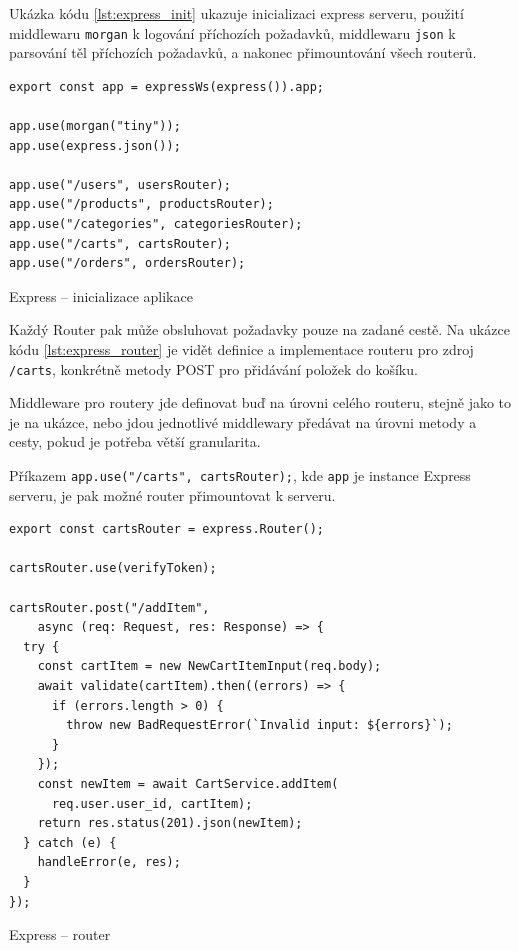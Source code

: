 \documentclass[thesis=M,czech]{FITthesis}[2019/12/23]
\begin{document}
Ukázka kódu \ref{lst:express_init} ukazuje inicializaci express serveru, použití middlewaru \texttt{morgan} k logování příchozích požadavků, middlewaru \texttt{json} k parsování těl příchozích požadavků, a nakonec přimountování všech routerů.

\begin{listing}[H]
\begin{verbatim}
export const app = expressWs(express()).app;

app.use(morgan("tiny"));
app.use(express.json());

app.use("/users", usersRouter);
app.use("/products", productsRouter);
app.use("/categories", categoriesRouter);
app.use("/carts", cartsRouter);
app.use("/orders", ordersRouter);

\end{verbatim}
\caption{Express -- inicializace aplikace}
\label{lst:express_init}
\end{listing}

Každý Router pak může obsluhovat požadavky pouze na zadané cestě. Na ukázce kódu \ref{lst:express_router} je vidět definice a implementace routeru pro zdroj \texttt{/carts}, konkrétně metody POST pro přidávání položek do košíku.

Middleware pro routery jde definovat buď na úrovni celého routeru, stejně jako to je na ukázce, nebo jdou jednotlivé middlewary předávat na úrovni metody a cesty, pokud je potřeba větší granularita.

Příkazem \texttt{app.use("/carts", cartsRouter);}, kde \texttt{app} je instance Express serveru, je pak možné router přimountovat k serveru.

\begin{listing}[H]
\begin{verbatim}
export const cartsRouter = express.Router();

cartsRouter.use(verifyToken);

cartsRouter.post("/addItem",
    async (req: Request, res: Response) => {
  try {
    const cartItem = new NewCartItemInput(req.body);
    await validate(cartItem).then((errors) => {
      if (errors.length > 0) {
        throw new BadRequestError(`Invalid input: ${errors}`);
      }
    });
    const newItem = await CartService.addItem(
      req.user.user_id, cartItem);
    return res.status(201).json(newItem);
  } catch (e) {
    handleError(e, res);
  }
});
\end{verbatim}
\caption{Express -- router}
\label{lst:express_router}
\end{listing}
\end{document}
